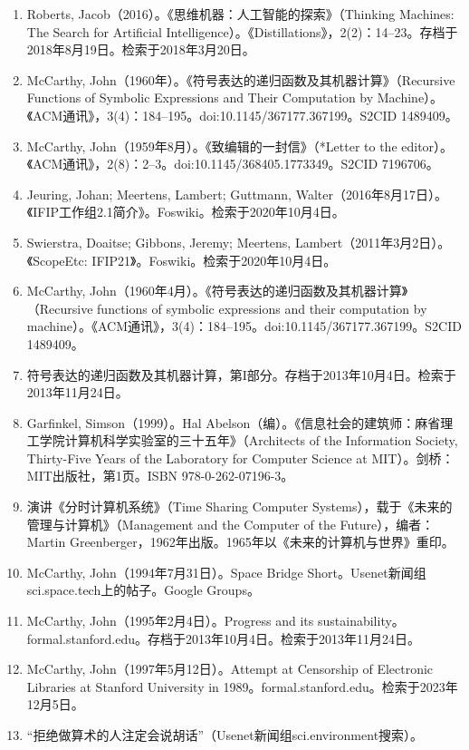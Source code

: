 \begin{enumerate}
\item Roberts, Jacob（2016）。《思维机器：人工智能的探索》（Thinking Machines: The Search for Artificial Intelligence）。《Distillations》，2(2)：14–23。存档于2018年8月19日。检索于2018年3月20日。
\item McCarthy, John（1960年）。《符号表达的递归函数及其机器计算》（Recursive Functions of Symbolic Expressions and Their Computation by Machine）。《ACM通讯》，3(4)：184–195。doi:10.1145/367177.367199。S2CID 1489409。
\item McCarthy, John（1959年8月）。《致编辑的一封信》（*Letter to the editor）。《ACM通讯》，2(8)：2–3。doi:10.1145/368405.1773349。S2CID 7196706。
\item Jeuring, Johan; Meertens, Lambert; Guttmann, Walter（2016年8月17日）。《IFIP工作组2.1简介》。Foswiki。检索于2020年10月4日。
\item Swierstra, Doaitse; Gibbons, Jeremy; Meertens, Lambert（2011年3月2日）。《ScopeEtc: IFIP21》。Foswiki。检索于2020年10月4日。
\item McCarthy, John（1960年4月）。《符号表达的递归函数及其机器计算》（Recursive functions of symbolic expressions and their computation by machine）。《ACM通讯》，3(4)：184–195。doi:10.1145/367177.367199。S2CID 1489409。
\item 符号表达的递归函数及其机器计算，第I部分。存档于2013年10月4日。检索于2013年11月24日。
\item Garfinkel, Simson（1999）。Hal Abelson（编）。《信息社会的建筑师：麻省理工学院计算机科学实验室的三十五年》（Architects of the Information Society, Thirty-Five Years of the Laboratory for Computer Science at MIT）。剑桥：MIT出版社，第1页。ISBN 978-0-262-07196-3。
\item 演讲《分时计算机系统》（Time Sharing Computer Systems），载于《未来的管理与计算机》（Management and the Computer of the Future），编者：Martin Greenberger，1962年出版。1965年以《未来的计算机与世界》重印。
\item McCarthy, John（1994年7月31日）。Space Bridge Short。Usenet新闻组sci.space.tech上的帖子。Google Groups。
\item McCarthy, John（1995年2月4日）。Progress and its sustainability。formal.stanford.edu。存档于2013年10月4日。检索于2013年11月24日。
\item McCarthy, John（1997年5月12日）。Attempt at Censorship of Electronic Libraries at Stanford University in 1989。formal.stanford.edu。检索于2023年12月5日。
\item “拒绝做算术的人注定会说胡话”（Usenet新闻组sci.environment搜索）。

\end{enumerate}
